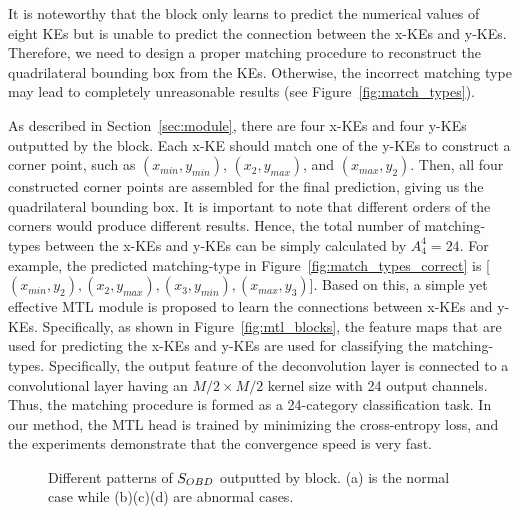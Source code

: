 It is noteworthy that the \Ours block only learns to predict the numerical values of eight KEs but is unable to predict the connection between the x-KEs and y-KEs. Therefore, we need to design a proper matching procedure to reconstruct the quadrilateral bounding box from the KEs. Otherwise, the incorrect matching type may lead to completely unreasonable results (see Figure~\ref{fig:match_types}).

As described in Section~\ref{sec:module}, there are four x-KEs and four y-KEs outputted by the \Ours block. Each x-KE should match one of the y-KEs to construct a corner point, such as $(x_{min}, y_{min})$, $(x_{2}, y_{max})$, and $(x_{max}, y_{2})$. Then, all four constructed corner points are assembled for the final prediction, giving us the quadrilateral bounding box. It is important to note that different orders of the corners would produce different results. 
Hence, the total number of matching-types between the x-KEs and y-KEs can be simply calculated by $A^{4}_{4} = 24$. For example, the predicted matching-type in Figure~\ref{fig:match_types_correct} is [$(x_{min}, y_{2}), (x_{2}, y_{max}), (x_{3}, y_{min}), (x_{max}, y_{3})$]. Based on this, a simple yet effective MTL module is proposed to learn the connections between x-KEs and y-KEs. Specifically, as shown in Figure~\ref{fig:mtl_blocks}, the feature maps that are used for predicting the x-KEs and y-KEs are used for classifying the matching-types. Specifically, the output feature of the deconvolution layer is connected to a convolutional layer having an $M/2 \times M/2$ kernel size with 24 output channels. Thus, the matching procedure is formed as a 24-category classification task. In our method, the MTL head is trained by minimizing the cross-entropy loss, and the experiments demonstrate that the convergence speed is very fast. 


\begin{figure}[t!]
    \centering
    \hspace{0.05cm}
    
    \hspace{0.05cm}
    \caption{Different patterns of $S_{   {OBD}  }$ outputted by    \Ours   block. (a) is the normal case while (b)(c)(d) are abnormal cases.}
    \label{fig:KE_score_pattern}
\end{figure}

